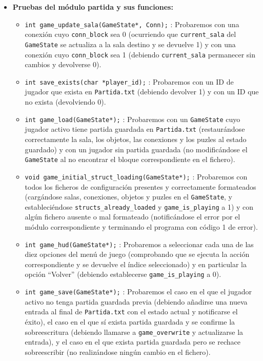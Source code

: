 \begin{itemize}
		\item \textbf{Pruebas del módulo partida y sus funciones:}
		\begin{itemize}
			\item \verb|int game_update_sala(GameState*, Conn);| : Probaremos con una conexión cuyo \verb|conn_block| 
			sea 0 (ocurriendo que \verb|current_sala| del \verb|GameState| se actualiza a la sala destino y se devuelve 1) 
			y con una conexión cuyo \verb|conn_block| sea 1 (debiendo \verb|current_sala| permanecer sin cambios y devolverse 0).
			\item \verb|int save_exists(char *player_id);| : Probaremos con un ID de jugador que exista en \verb|Partida.txt| 
			(debiendo devolver 1) y con un ID que no exista (devolviendo 0).
			\item \verb|int game_load(GameState*);| : Probaremos con un \verb|GameState| cuyo jugador activo tiene partida 
			guardada en \verb|Partida.txt| (restaurándose correctamente la sala, los objetos, las conexiones y los puzles al estado guardado) 
			y con un jugador sin partida guardada (no modificándose el \verb|GameState| al no encontrar el bloque correspondiente en el fichero).
			\item \verb|void game_initial_struct_loading(GameState*);| : Probaremos con todos los ficheros de configuración presentes 
			y correctamente formateados (cargándose salas, conexiones, objetos y puzles en el \verb|GameState|, y estableciéndose 
			\verb|structs_already_loaded| y \verb|game_is_playing| a 1) y con algún fichero ausente o mal formateado 
			(notificándose el error por el módulo correspondiente y terminando el programa con código 1 de error).
			\item \verb|int game_hud(GameState*);| : Probaremos a seleccionar cada una de las diez opciones del menú de juego
			(comprobando que se ejecuta la acción correspondiente y se devuelve el índice seleccionado) y en particular
			la opción ``Volver'' (debiendo establecerse \verb|game_is_playing| a 0).
			\item \verb|int game_save(GameState*);| : Probaremos el caso en el que el jugador activo no tenga partida guardada previa
			(debiendo añadirse una nueva entrada al final de \verb|Partida.txt| con el estado actual y notificarse el éxito), 
			el caso en el que sí exista partida guardada y se confirme la sobreescritura (debiendo llamarse a \verb|game_overwrite| y 
			actualizarse la entrada), y el caso en el que exista partida guardada pero se rechace sobreescribir 
			(no realizándose ningún cambio en el fichero).

\end{itemize}
\end{itemize}
